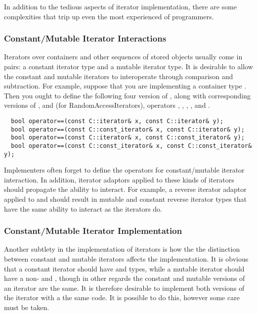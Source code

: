 \documentclass{netobjectdays}
\begin{document}
In addition to the tedious aspects of iterator implementation, there
are some complexities that trip up even the most experienced of
programmers.

\subsubsection{Constant/Mutable Iterator Interactions}

Iterators over containers and other sequences of stored objects
usually come in pairs: a constant iterator type and a mutable iterator
type. It is desirable to allow the constant and mutable iterators to
interoperate through comparison and
subtraction. For example, suppose
that you are implementing a container type . Then you ought to
define the following four version of , along with
corresponding versions of , and (for
RandomAccessIterators), operators \code{<}, \code{>},
\code{<=}, \code{>=}, and \code{-}.


{\footnotesize
\begin{verbatim}
  bool operator==(const C::iterator& x, const C::iterator& y);
  bool operator==(const C::const_iterator& x, const C::iterator& y);
  bool operator==(const C::iterator& x, const C::const_iterator& y);
  bool operator==(const C::const_iterator& x, const C::const_iterator& y);
\end{verbatim}
}

Implementers often forget to define the operators for constant/mutable
iterator interaction. In addition, iterator adaptors applied to these
kinds of iterators should propagate the ability to interact. For
example, a reverse iterator adaptor applied to  and
 should result in mutable and constant reverse iterator types that
have the same ability to interact as the  iterators do.

\subsubsection{Constant/Mutable Iterator Implementation}

Another subtlety in the implementation of iterators is how the the
distinction between constant and mutable iterators affects the
implementation. It is obvious that a constant iterator should have
  and  types, while a mutable iterator should have a
non-  and , though in other regards the constant and
mutable versions of an iterator are the same. It is therefore
desirable to implement both versions of the iterator with a the same
code. It is possible to do this, however some care must be taken.
\end{document}
